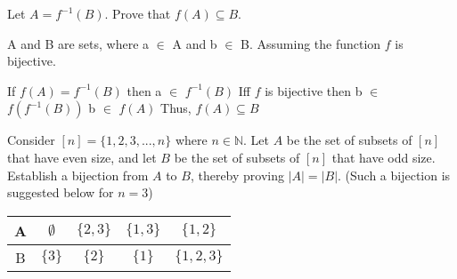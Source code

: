 \documentclass[addpoints]{exam}
\begin{document}
\begin{questions}
\question[15] Let $A = f^{-1}(B)$. Prove that $f(A) \subseteq B$.
  \begin{solution}
    \newline
    A and B are sets, where a $\in$ A and b $\in$ B. Assuming the function $f$ is bijective. \newline
    \begin{center}
        If $f(A) = f^{-1}(B)$ \newline
        then a $\in$ $f^{-1}(B)$ \newline
        Iff $f$ is bijective \newline
        then b $\in$ $f(f^{-1}(B))$ \newline
        b $\in$ $f(A)$ \newline
        Thus, $f(A) \subseteq B$ \newline
    \end{center}
  \end{solution}

\question[15] Consider $[n] = \{1,2,3,...,n\}$ where $n \in \mathbb{N}$. Let $A$ be the set of subsets of $[n]$ that have even size, and let $B$ be the set of subsets of $[n]$ that have odd size. Establish a bijection from $A$ to $B$, thereby proving $|A| = |B|$. (Such a bijection is suggested below for $n = 3$) 

\begin{center}

  \begin{tabular}{ |c || c | c | c |c |}
    \hline
 A & $\emptyset$ & $\{2,3\}$ & $\{1,3\}$ & $\{1,2\}$ \\ \hline
 B & $\{3\}$ & $\{2\}$ & $\{1\}$ & $\{1,2,3\}$\\\hline
\end{tabular}
\end{center}


\end{questions}
\end{document}
